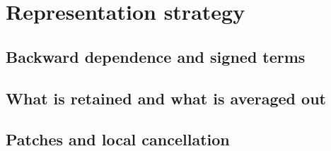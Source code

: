 \section{Representation strategy}
\label{sec:representation-strategy}

\subsection{Backward dependence and signed terms}

\subsection{What is retained and what is averaged out}

\subsection{Patches and local cancellation}
